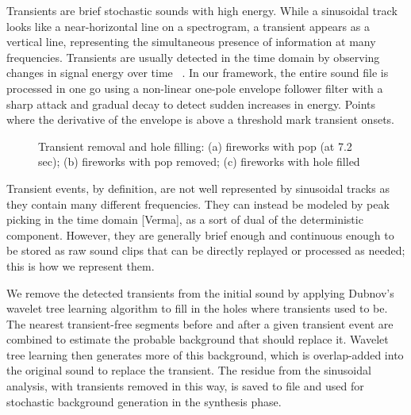 \documentclass{acmsiggraph}               %
\begin{document}
Transients are brief stochastic sounds with high energy. While a sinusoidal track 
looks like a near-horizontal line on a spectrogram, a transient 
appears as a vertical line, representing the simultaneous presence of information 
at many frequencies. Transients are usually detected in the time domain by observing 
changes in signal energy over time ~\cite{Verma98,Bello05}. 
In our framework, the entire sound file is processed in 
one go using a non-linear one-pole envelope follower filter with a sharp attack and gradual 
decay to detect sudden increases in energy. Points where the derivative of the envelope 
is above a threshold mark transient onsets. 
\begin{figure}[h]
\setlength\textfloatsep{0pt}
\setlength\abovecaptionskip{0pt}
\setlength\belowcaptionskip{0pt}
\centering
\caption{Transient removal and hole filling: (a) fireworks with pop (at 7.2 sec); (b) 
fireworks with pop removed; (c) fireworks with hole filled}
\label{fig:transient}
\end{figure}

Transient events, by definition, are not well represented by sinusoidal tracks as they 
contain many different frequencies. They can instead be modeled by peak picking in the 
time domain [Verma], as a sort of dual of the deterministic component. 
However, they are generally brief enough and continuous enough to be 
stored as raw sound clips that can be directly replayed or processed as needed; 
this is how we represent them. 

We remove the detected transients from the initial sound by applying Dubnov's 
~ wavelet tree learning algorithm to fill in the holes where transients 
used to be. The nearest transient-free segments before and after a given transient event are 
combined to estimate the probable background that should replace it. Wavelet tree 
learning then generates more of this background, which is overlap-added into the original 
sound to replace the transient. The residue from the sinusoidal analysis, with transients 
removed in this way, is saved to file and used for stochastic background generation in the 
synthesis phase. 
\end{document}
